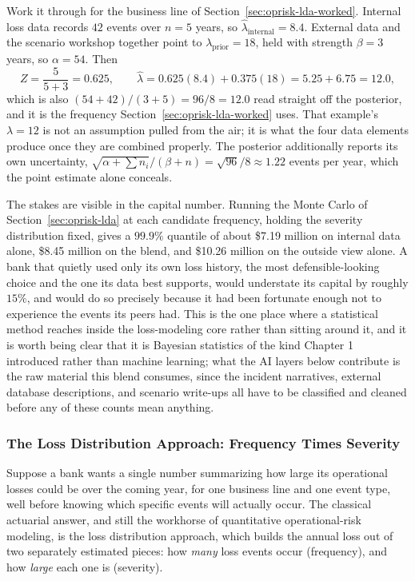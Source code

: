 \documentclass[../ai_in_finance]{subfiles}
\begin{document}
Work it through for the business line of Section~\ref{sec:oprisk-lda-worked}. Internal loss data records $42$ events over $n=5$ years, so $\hat\lambda_{\text{internal}} = 8.4$. External data and the scenario workshop together point to $\lambda_{\text{prior}} = 18$, held with strength $\beta = 3$ years, so $\alpha = 54$. Then
\begin{equation*}
Z = \frac{5}{5+3} = 0.625, \qquad
\hat\lambda = 0.625(8.4) + 0.375(18) = 5.25 + 6.75 = 12.0,
\end{equation*}
which is also $(54+42)/(3+5) = 96/8 = 12.0$ read straight off the posterior, and it is the frequency Section~\ref{sec:oprisk-lda-worked} uses. That example's $\lambda = 12$ is not an assumption pulled from the air; it is what the four data elements produce once they are combined properly. The posterior additionally reports its own uncertainty, $\sqrt{\alpha+\sum n_i}/(\beta+n) = \sqrt{96}/8 \approx 1.22$ events per year, which the point estimate alone conceals.

The stakes are visible in the capital number. Running the Monte Carlo of Section~\ref{sec:oprisk-lda} at each candidate frequency, holding the severity distribution fixed, gives a $99.9\%$ quantile of about \$7.19 million on internal data alone, \$8.45 million on the blend, and \$10.26 million on the outside view alone. A bank that quietly used only its own loss history, the most defensible-looking choice and the one its data best supports, would understate its capital by roughly $15\%$, and would do so precisely because it had been fortunate enough not to experience the events its peers had. This is the one place where a statistical method reaches inside the loss-modeling core rather than sitting around it, and it is worth being clear that it is Bayesian statistics of the kind Chapter 1 introduced rather than machine learning; what the AI layers below contribute is the raw material this blend consumes, since the incident narratives, external database descriptions, and scenario write-ups all have to be classified and cleaned before any of these counts mean anything.

\subsubsection*{The Loss Distribution Approach: Frequency Times Severity}
\label{sec:oprisk-lda}

Suppose a bank wants a single number summarizing how large its operational losses could be over the coming year, for one business line and one event type, well before knowing which specific events will actually occur. The classical actuarial answer, and still the workhorse of quantitative operational-risk modeling, is the loss distribution approach, which builds the annual loss out of two separately estimated pieces: how \emph{many} loss events occur (frequency), and how \emph{large} each one is (severity).
\end{document}
